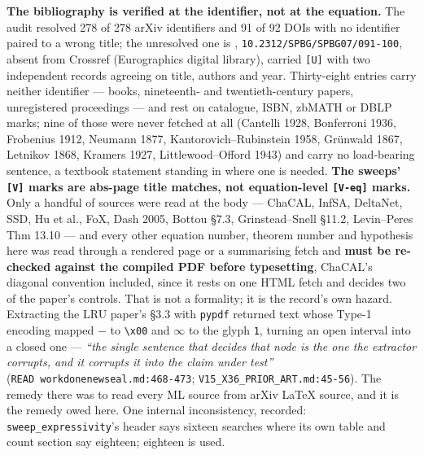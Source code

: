 \documentclass[11pt,a4paper]{article}
\theoremstyle{plain}
\theoremstyle{definition}
\theoremstyle{remark}
\begin{document}
\textbf{The bibliography is verified at the identifier, not at the
equation.} The audit resolved 278 of 278 arXiv identifiers and 91 of 92
DOIs with no identifier paired to a wrong title; the unresolved one is
\citep{singh-2007-mapper}, \texttt{10.2312/SPBG/SPBG07/091-100}, absent
from Crossref (Eurographics digital library), carried \texttt{{[}U{]}}
with two independent records agreeing on title, authors and year.
Thirty-eight entries carry neither identifier --- books, nineteenth- and
twentieth-century papers, unregistered proceedings --- and rest on
catalogue, ISBN, zbMATH or DBLP marks; nine of those were never fetched
at all (Cantelli 1928, Bonferroni 1936, Frobenius 1912, Neumann 1877,
Kantorovich--Rubinstein 1958, Grünwald 1867, Letnikov 1868, Kramers
1927, Littlewood--Offord 1943) and carry no load-bearing sentence, a
textbook statement standing in where one is needed. \textbf{The sweeps'
\texttt{{[}V{]}} marks are abs-page title matches, not equation-level
\texttt{{[}V-eq{]}} marks.} Only a handful of sources were read at the
body --- ChaCAL, InfSA, DeltaNet, SSD, Hu et al., FoX, Dash 2005, Bottou
§7.3, Grinstead--Snell §11.2, Levin--Peres Thm 13.10 --- and every other
equation number, theorem number and hypothesis here was read through a
rendered page or a summarising fetch and \textbf{must be re-checked
against the compiled PDF before typesetting}, ChaCAL's diagonal
convention included, since it rests on one HTML fetch and decides two of
the paper's controls. That is not a formality; it is the record's own
hazard. Extracting the LRU paper's §3.3 with \texttt{pypdf} returned
text whose Type-1 encoding mapped \(-\) to \texttt{\textbackslash{}x00}
and \(\infty\) to the glyph \texttt{1}, turning an open interval into a
closed one --- \emph{``the single sentence that decides that node is the
one the extractor corrupts, and it corrupts it into the claim under
test''} (\texttt{READ\ workdonenewseal.md:468-473};
\texttt{V15\_X36\_PRIOR\_ART.md:45-56}). The remedy there was to read
every ML source from arXiv LaTeX source, and it is the remedy owed here.
One internal inconsistency, recorded: \texttt{sweep\_expressivity}'s
header says sixteen searches where its own table and count section say
eighteen; eighteen is used.
\end{document}
